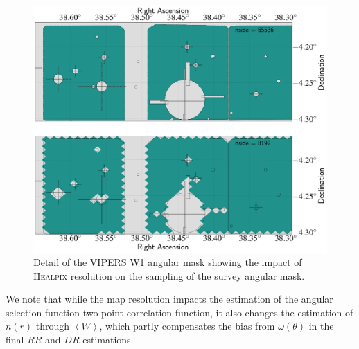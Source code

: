 \documentclass{aa}
\newcommand{\ev}[1]{\left\langle #1 \right\rangle}
\begin{document}
%
\begin{figure}
\centering
\includegraphics[width=\columnwidth]{Figures/vipers_resolution.png} 
    \caption{Detail of the VIPERS W1 angular mask showing the impact of \textsc{Healpix} resolution on the sampling of the survey angular mask.}
    \label{fig:vipers_resolution}
\end{figure}
%
We note that while the map resolution impacts the estimation of the angular selection function two-point correlation function, it also changes the estimation of $n(r)$ through $\ev{W}$, which partly compensates the bias from $\omega(\theta)$ in the final $RR$ and $DR$ estimations.
\end{document}
